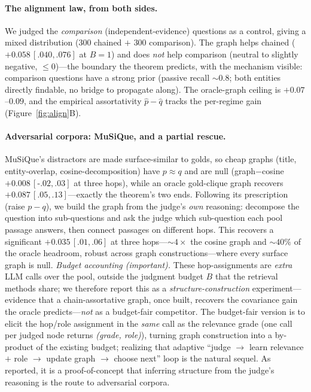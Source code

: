 \documentclass[11pt]{article}
\theoremstyle{plain}\newtheorem{theorem}{Theorem}\newtheorem{lemma}{Lemma}\newtheorem{proposition}{Proposition}
\theoremstyle{definition}\newtheorem{assumption}{Assumption}\newtheorem{remark}{Remark}
\begin{document}
\paragraph{The alignment law, from both sides.} We judged the \emph{comparison} (independent-evidence) questions
as a control, giving a mixed distribution ($300$ chained $+$ $300$ comparison). The graph helps chained
($+0.058\,[.040,.076]$ at $B{=}1$) and does \emph{not} help comparison (neutral to slightly negative,
$\le 0$)---the boundary the theorem predicts, with the mechanism visible: comparison questions have a strong prior
(passive recall $\sim0.8$; both entities directly findable, no bridge to propagate along). The oracle-graph
ceiling is $+0.07$--$0.09$, and the empirical assortativity $\hat p-\hat q$ tracks the per-regime gain
(Figure~\ref{fig:align}B).

\paragraph{Adversarial corpora: MuSiQue, and a partial rescue.} MuSiQue's distractors are made surface-similar to
golds, so cheap graphs (title, entity-overlap, cosine-decomposition) have $p\approx q$ and are null
(graph$-$cosine $+0.008\,[\text{-}.02,.03]$ at three hops), while an oracle gold-clique graph recovers
$+0.087\,[.05,.13]$---exactly the theorem's two ends. Following its prescription (raise $p-q$), we build the graph
from the judge's \emph{own} reasoning: decompose the question into sub-questions and ask the judge which
sub-question each pool passage answers, then connect passages on different hops. This recovers a significant
$+0.035\,[.01,.06]$ at three hops---$\sim4\times$ the cosine graph and $\sim40\%$ of the oracle headroom, robust
across graph constructions---where every surface graph is null. \emph{Budget accounting (important).} These
hop-assignments are \emph{extra} LLM calls over the pool, outside the judgment budget $B$ that the retrieval
methods share; we therefore report this as a \emph{structure-construction} experiment---evidence that a
chain-assortative graph, once built, recovers the covariance gain the oracle predicts---\emph{not} as a
budget-fair competitor. The budget-fair version is to elicit the hop/role assignment in the \emph{same} call as
the relevance grade (one call per judged node returns \emph{(grade, role)}), turning graph construction into a
by-product of the existing budget; realizing that adaptive ``judge $\to$ learn relevance $+$ role $\to$ update
graph $\to$ choose next'' loop is the natural sequel. As reported, it is a proof-of-concept that inferring
structure from the judge's reasoning is the route to adversarial corpora.
\end{document}

